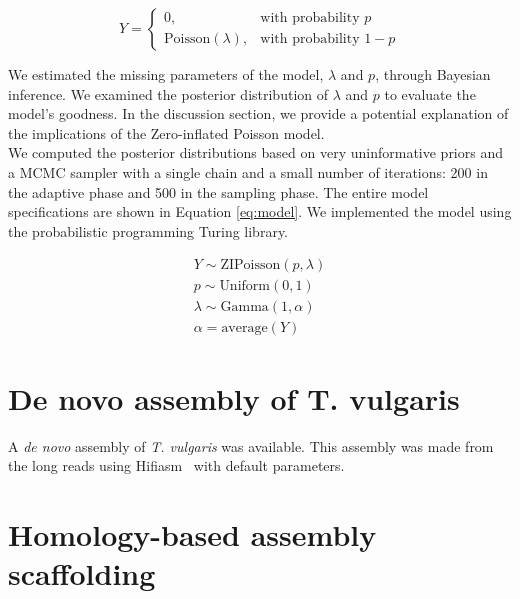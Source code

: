 \begin{equation}
\label{eq:zip}
Y = \begin{cases} 0, & \textrm{with probability } p \\ \textrm{Poisson}(\lambda), & \textrm{with probability } 1-p \end{cases}
\end{equation}

We estimated the missing parameters of the model, $\lambda$ and $p$, through Bayesian inference. We examined the posterior distribution of $\lambda$ and $p$ to evaluate the model's goodness. In the discussion section, we provide a potential explanation of the implications of the Zero-inflated Poisson model.\\

We computed the posterior distributions based on very uninformative priors and a \ac{MCMC} sampler with a single chain and a small number of iterations: 200 in the adaptive phase and 500 in the sampling phase. The entire model specifications are shown in Equation \eqref{eq:model}. We implemented the model using the probabilistic programming Turing library. ~\cite{DBLP:conf/aistats/GeXG18}

\begin{subequations}
\label{eq:model}
\begin{align}
Y \sim \textrm{ZIPoisson}(p, \lambda) \label{eq:model1}\\
p \sim \textrm{Uniform}(0, 1) \label{eq:model2}\\
\lambda \sim \textrm{Gamma}(1, \alpha)  \label{eq:model3}\\
\alpha = \textrm{average}(Y) \label{eq:model4}
\end{align}   
\end{subequations}

\section*{De novo assembly of T. vulgaris}\label{sec:denovo}

A \textit{de novo} assembly of \textit{T. vulgaris} was available. This assembly was made from the long reads using Hifiasm~\cite{chengHaplotyperesolvedNovoAssembly2021} with default parameters.

\section*{Homology-based assembly scaffolding}\label{sec:scaffold}

